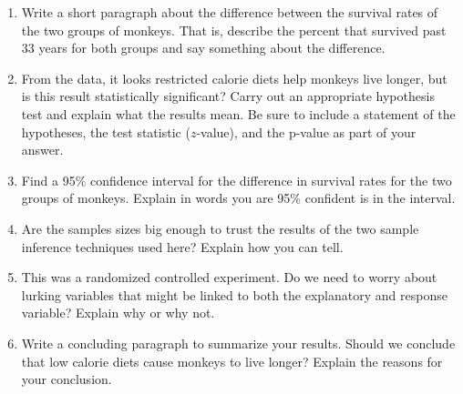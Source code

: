 \documentclass[12pt]{article}
\begin{document}
\begin{enumerate}

\item Write a short paragraph about the difference between the survival rates of the two groups of monkeys.  That is, describe the percent that survived past 33 years for both groups and say something about the difference. 


\item From the data, it looks restricted calorie diets help monkeys live longer, but is this result statistically significant? Carry out an appropriate hypothesis test and explain what the results mean.  Be sure to include a statement of the hypotheses, the test statistic ($z$-value), and the p-value as part of your answer.  

\item Find a 95\% confidence interval for the difference in survival rates for the two groups of monkeys. Explain in words you are 95\% confident is in the interval. 

\item Are the samples sizes big enough to trust the results of the two sample inference techniques used here?  Explain how you can tell.  

\item This was a randomized controlled experiment. Do we need to worry about lurking variables that might be linked to both the explanatory and response variable? Explain why or why not.  

\item Write a concluding paragraph to summarize your results.  Should we conclude that low calorie diets cause monkeys to live longer?  Explain the reasons for your conclusion.
\end{enumerate}
\end{document}
